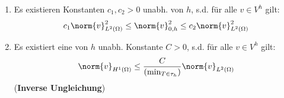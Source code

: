 \begin{satz}
\begin{enumerate}
\item
 Es existieren Konstanten $c_1,c_2 >0$ unabh. von $h$, s.d. für alle $v \in V^h$ gilt:
\[ c_1 \norm{v}^2_{L^2(\Omega)} \leq \norm{v}^2_{0,h} \leq c_2 \norm{v}^2_{L^2(\Omega)} \]
\item
Es existiert eine von $h$ unabh. Konstante $C>0$, s.d. für alle $v \in V^h$ gilt:
\[ \norm{v}_{H^1(\Omega)} \leq \frac{C}{(\min_{T \in \tau_h})} \norm{v}_{L^2(\Omega)} \]
(\textbf{Inverse Ungleichung})
\end{enumerate}
\end{satz}

